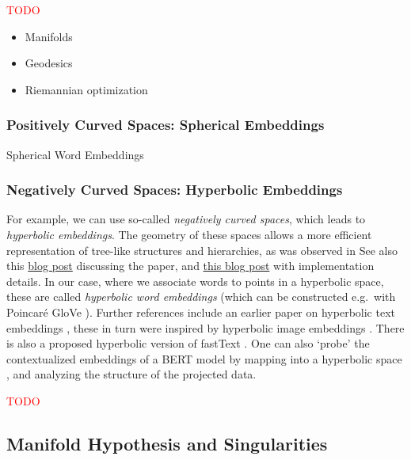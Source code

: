 \documentclass[11pt, a4paper]{amsart}
\begin{document}
\textcolor{red}{TODO} 
\begin{itemize}
	\item Manifolds
	\item Geodesics
	\item Riemannian optimization
\end{itemize}

\subsubsection{Positively Curved Spaces: Spherical Embeddings}

Spherical Word Embeddings \cite{Meng2019SphericalTE}



\subsubsection{Negatively Curved Spaces: Hyperbolic Embeddings}

For example, we can use so-called \emph{negatively curved spaces}, which leads to \emph{hyperbolic embeddings}.
The geometry of these spaces allows a more efficient representation of tree-like structures and hierarchies, as was observed in \cite{DBLP:journals/corr/NickelK17}
See also this \href{https://bjlkeng.github.io/posts/hyperbolic-geometry-and-poincare-embeddings/}{blog post} discussing the paper, and \href{https://rare-technologies.com/implementing-poincare-embeddings/}{this blog post} with implementation details.
In our case, where we associate words to points in a hyperbolic space, these are called \emph{hyperbolic word embeddings} (which can be constructed e.g.\ with Poincar{\'e} GloVe \cite{DBLP:journals/corr/abs-1810-06546}).
Further references include an earlier paper on hyperbolic text embeddings \cite{DBLP:journals/corr/abs-1806-04313},
these in turn were inspired by hyperbolic image embeddings \cite{DBLP:journals/corr/abs-1904-02239}.
There is also a proposed hyperbolic version of fastText \cite{zhu-etal-2020-hypertext}.
One can also `probe' the contextualized embeddings of a BERT model by mapping into a hyperbolic space \cite{DBLP:journals/corr/abs-2104-03869}, and analyzing the structure of the projected data.

\textcolor{red}{TODO}


\subsection{Manifold Hypothesis and Singularities}
\end{document}
